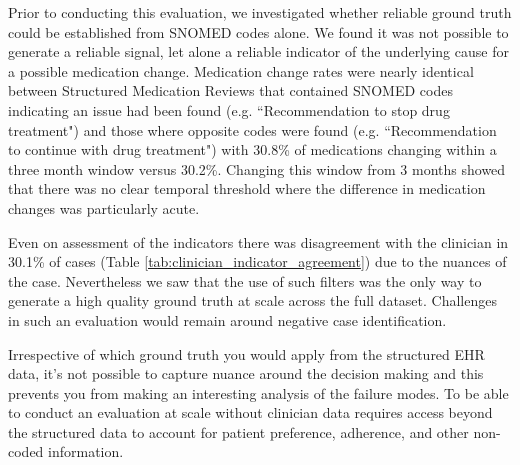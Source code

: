 \label{app:ground-truth-challenges}
Prior to conducting this evaluation, we investigated whether reliable ground truth could be established from SNOMED codes alone. We found it was not possible to generate a reliable signal, let alone a reliable indicator of the underlying cause for a possible medication change. Medication change rates were nearly identical between Structured Medication Reviews that contained SNOMED codes indicating an issue had been found (e.g. ``Recommendation to stop drug treatment") and those where opposite codes were found (e.g. ``Recommendation to continue with drug treatment") with 30.8\% of medications changing within a three month window versus 30.2\%. Changing this window from 3 months showed that there was no clear temporal threshold where the difference in medication changes was particularly acute.

Even on assessment of the indicators there was disagreement with the clinician in 30.1\% of cases (Table \ref{tab:clinician_indicator_agreement}) due to the nuances of the case. Nevertheless we saw that the use of such filters was the only way to generate a high quality ground truth at scale across the full dataset. Challenges in such an evaluation would remain around negative case identification.

Irrespective of which ground truth you would apply from the structured EHR data, it's not possible to capture nuance around the decision making and this prevents you from making an interesting analysis of the failure modes. To be able to conduct an evaluation at scale without clinician data requires access beyond the structured data to account for patient preference, adherence, and other non-coded information.
